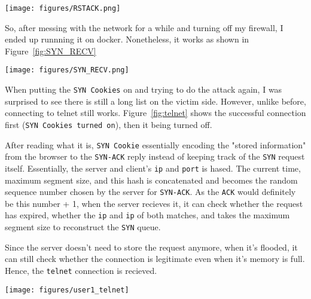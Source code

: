 \begin{figure*}[h]
\centering
  \texttt{[image: figures/RSTACK.png]}
  \caption{RST/ACk}
\label{fig:rst_ack}
\end{figure*}

So, after messing with the network for a while and turning off my firewall, I ended up runnning it on docker. Nonetheless, it works as shown in Figure~\ref{fig:SYN_RECV}

  \begin{figure*}[h]
    \centering
      \texttt{[image: figures/SYN\_RECV.png]}
      \caption{SYN_RECV}
    \label{fig:SYN_RECV}
    \end{figure*}
    
When putting the \texttt{SYN Cookies} on and trying to do the attack again, I was surprised to see there is still a long list on the victim side. However, unlike before, connecting to telnet still works. Figure~\ref{fig:telnet} shows the successful connection first (\texttt{SYN Cookies turned on}), then it being turned off.

After reading what it is, \texttt{SYN Cookie} essentially encoding the "stored information" from the browser to the \texttt{SYN-ACK} reply instead of keeping track of the \texttt{SYN} request itself. Essentially, the server and client's \texttt{ip} and \texttt{port} is hased. The current time, maximum segment size, and this hash is concatenated and becomes the random sequence number chosen by the server for \texttt{SYN-ACK}. As the \texttt{ACK} would definitely be this number + 1, when the server recieves it, it can check whether the request has expired, whether the \texttt{ip} and  \texttt{ip} of both matches, and takes the maximum segment size to reconstruct the \texttt{SYN} queue.

Since the server doesn't need to store the request anymore, when it's flooded, it can still check whether the connection is legitimate even when it's memory is full. Hence, the \texttt{telnet} connection is recieved.

  \begin{figure*}[h]
    \centering
      \texttt{[image: figures/user1\_telnet]}
      \caption{telnet}
    \label{fig:telnet}
    \end{figure*}
